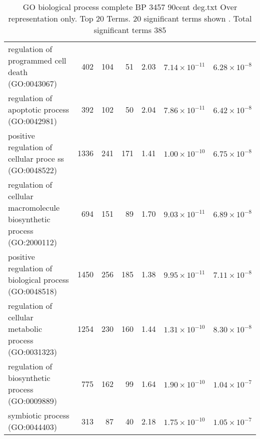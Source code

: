 \begin{table}[ht]
\begin{adjustbox}{width=\textwidth}
\begin{tabular}{lrrrlrr}
  regulation of programmed cell death (GO:0043067) & 402 & 104 & 51 & 2.03 & $7.14 \times 10^{-11}$ & $6.28 \times 10^{-8}$ \\ 
  regulation of apoptotic process (GO:0042981) & 392 & 102 & 50 & 2.04 & $7.86 \times 10^{-11}$ & $6.42 \times 10^{-8}$ \\ 
  positive regulation of cellular proce ss (GO:0048522) & 1336 & 241 & 171 & 1.41 & $1.00 \times 10^{-10}$ & $6.75 \times 10^{-8}$ \\ 
  regulation of cellular macromolecule biosynthetic process (GO:2000112) & 694 & 151 & 89 & 1.70 & $9.03 \times 10^{-11}$ & $6.89 \times 10^{-8}$ \\ 
  positive regulation of biological process (GO:0048518) & 1450 & 256 & 185 & 1.38 & $9.95 \times 10^{-11}$ & $7.11 \times 10^{-8}$ \\ 
  regulation of cellular metabolic process (GO:0031323) & 1254 & 230 & 160 & 1.44 & $1.31 \times 10^{-10}$ & $8.30 \times 10^{-8}$ \\ 
  regulation of biosynthetic process (GO:0009889) & 775 & 162 & 99 & 1.64 & $1.90 \times 10^{-10}$ & $1.04 \times 10^{-7}$ \\ 
  symbiotic process (GO:0044403) & 313 & 87 & 40 & 2.18 & $1.75 \times 10^{-10}$ & $1.05 \times 10^{-7}$ \\ 
   \hline
\end{tabular}
\end{adjustbox}
\caption{GO biological process complete BP 3457 90cent deg.txt Over representation only. Top 20 Terms. 20 significant terms shown . Total significant terms 385} 
\label{tab:GO biological process complete BP 3457 90cent deg.txt Over representation only. Top 20 Terms. 20 significant terms shown . Total significant terms 385}
\end{table}


